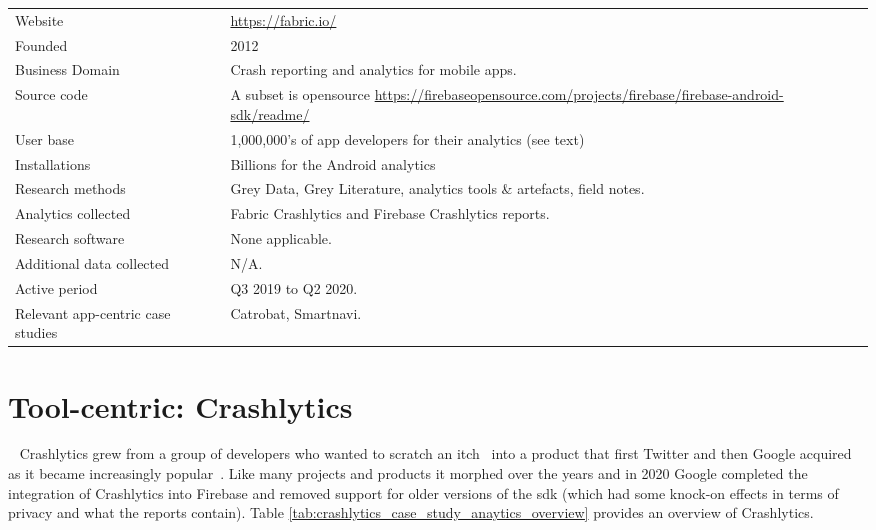 \begin{table*}[htbp!]
    \centering
    \small
    \renewcommand{\arraystretch}{0.8}%
    \setlength{\tabcolsep}{6pt}
    \begin{tabular}{lp{9cm}}
       \toprule
       Website &\url{https://fabric.io/} \\
       Founded & 2012 \\
       Business Domain & Crash reporting and analytics for mobile apps. \\
       Source code  & A subset is opensource \url{https://firebaseopensource.com/projects/firebase/firebase-android-sdk/readme/} \\
       \arrayrulecolor{blue!20}\midrule
       User base & 1,000,000's of app developers for their analytics (see text) \\ %
       Installations & Billions for the Android analytics \\ %
       \arrayrulecolor{blue!20}\midrule
       Research methods &Grey Data, Grey Literature, analytics tools \& artefacts, field notes. \\
       Analytics collected &Fabric Crashlytics and Firebase Crashlytics reports. \\
       Research software & None applicable. \\
       Additional data collected &N/A. \\
       Active period & Q3 2019 to Q2 2020. \\
       Relevant app-centric case studies & Catrobat, Smartnavi. \\
       \bottomrule
    \end{tabular}
    \caption{Tool Centric Case Study key facts: Crashlytics}
    \label{tab:crashlytics_case_study_anaytics_overview}
\end{table*}

\section{Tool-centric: Crashlytics}~\label{case-study-overview-crashlytics}
Crashlytics grew from a group of developers who wanted to scratch an itch~ into a product that first Twitter and then Google acquired as it became increasingly popular~. 
Like many projects and products it morphed over the years and in 2020 Google completed the integration of Crashlytics into Firebase and removed support for older versions of the \Gls{sdk} (which had some knock-on effects in terms of privacy and what the reports contain). Table \ref{tab:crashlytics_case_study_anaytics_overview} provides an overview of Crashlytics.

